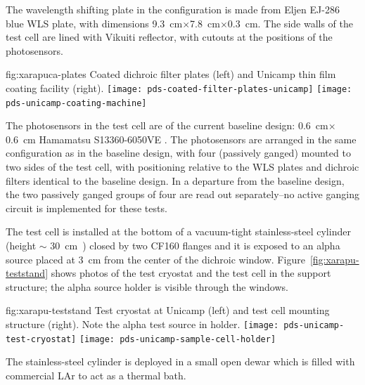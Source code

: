 The wavelength shifting plate in the  configuration is made from Eljen EJ-286 blue WLS plate, with dimensions \SI{9.3}{cm}$\times$\SI{7.8}{cm}$\times$\SI{0.3}{cm}.  The side walls of the test cell are lined with Vikuiti reflector, with cutouts at the positions of the photosensors.

\begin{dunefigure}{fig:xarapuca-plates}
{Coated dichroic filter plates (left) and Unicamp thin film coating facility (right).} 
	\texttt{[image: pds-coated-filter-plates-unicamp]}\quad
	\texttt{[image: pds-unicamp-coating-machine]}
\end{dunefigure}

The photosensors in the test cell are of the current baseline design:  \SI{0.6}{cm}$\times$\SI{0.6}{cm} Hamamatsu S13360-6050VE .  The photosensors are arranged in the same configuration as in the baseline design, with four  (passively ganged) mounted to two sides of the test cell, with positioning relative to the WLS plates and dichroic filters identical to the baseline design.  In a departure from the baseline design, the two passively ganged groups of four  are read out separately--no active ganging circuit is implemented for these tests. 

The test cell is installed at the bottom of a  vacuum-tight  stainless-steel cylinder (height $\sim$ \SI{30}{cm)} closed by two CF160 flanges and it is exposed to an alpha source placed at \SI{3}{cm} from the center of the dichroic window. Figure~\ref{fig:xarapu-teststand} shows photos of the test cryostat and the test cell in the support structure; the alpha source holder is visible through the windows.

\begin{dunefigure}{fig:xarapu-teststand}
{Test cryostat at Unicamp (left) and  test cell mounting structure (right).  Note the alpha test source in holder.} 
	\texttt{[image: pds-unicamp-test-cryostat]} \quad
	\texttt{[image: pds-unicamp-sample-cell-holder]}
\end{dunefigure}  

The stainless-steel cylinder  is deployed in a small open dewar which is filled with commercial LAr to act as a thermal bath.

